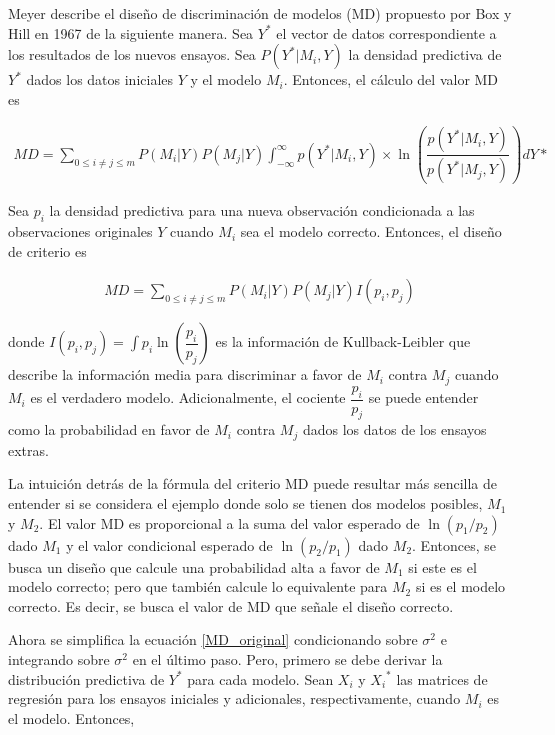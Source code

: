 Meyer describe el diseño de discriminación de modelos (MD) propuesto por Box y Hill en 1967 de la siguiente manera. Sea $Y^{*}$ el vector de datos correspondiente a los resultados de los nuevos ensayos. Sea $P(Y^{*}| M_i, Y)$ la densidad predictiva de $Y^{*}$ dados los datos iniciales $Y$ y el modelo $M_i$. Entonces, el cálculo del valor MD es

\begin{equation*}
	\begin{aligned}
		MD = \sum_{0 \leq i \neq j \leq m} P(M_i | Y) P(M_j | Y) \int_{-\infty}^{\infty} p(Y^{*} | M_i, Y) \times \ln(\dfrac{p(Y^{*} | M_i, Y)}{p(Y^{*} | M_j, Y)}) dY*
	\end{aligned}
\end{equation*}

Sea $p_i$ la densidad predictiva para una nueva observación condicionada a las observaciones originales $Y$ cuando $M_i$ sea el modelo correcto. Entonces, el diseño de criterio es 

\begin{equation} \label{MD_original}
	\begin{aligned}
		MD = \sum_{0 \leq i \neq j \leq m} P(M_i | Y)  P(M_j | Y) I(p_i, p_j)
	\end{aligned}
\end{equation}

\noindent donde $I(p_i, p_j) = \int p_i \ln(\dfrac{p_i}{p_j})$ es la información de Kullback-Leibler que describe la información media para discriminar a favor de $M_i$ contra $M_j$ cuando $M_i$ es el verdadero modelo. Adicionalmente, el cociente $\dfrac{p_i}{p_j}$ se puede entender como la probabilidad en favor de $M_i$ contra $M_j$ dados los datos de los ensayos extras. 

La intuición detrás de la fórmula del criterio MD puede resultar más sencilla de entender si se considera el ejemplo donde solo se tienen dos modelos posibles, $M_1$ y $M_2$. El valor MD es proporcional a la suma del valor esperado de $\ln(p_1/p_2)$ dado $M_1$ y el valor condicional esperado de  $\ln(p_2/p_1)$ dado $M_2$. Entonces, se busca un diseño que calcule una probabilidad alta a favor de $M_1$ si este es el modelo correcto; pero que también calcule lo equivalente para $M_2$ si es el modelo correcto. Es decir, se busca el valor de MD que señale el diseño correcto. 

Ahora se simplifica la ecuación \ref{MD_original} condicionando sobre $\sigma^{2}$ e integrando sobre $\sigma^{2}$ en el último paso. Pero, primero se debe derivar la distribución predictiva de $Y^{*}$ para cada modelo. Sean ${X_i}$ y ${X_i}^{*}$ las matrices de regresión para los ensayos iniciales y adicionales, respectivamente, cuando $M_i$ es el modelo. Entonces, 

